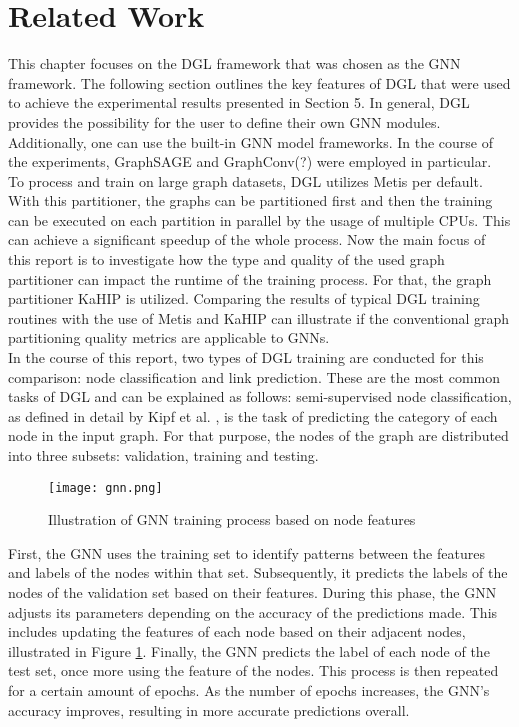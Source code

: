 \documentclass[acmsmall,nonacm,screen,review]{acmart}
\begin{document}
\section{Related Work}
This chapter focuses on the DGL framework that was chosen as the GNN framework. The following section outlines the key features of DGL that were used to achieve the experimental results presented in Section 5. In general, DGL provides the possibility for the user to define their own GNN modules. Additionally, one can use the built-in GNN model frameworks. In the course of the experiments, GraphSAGE \cite{GraphSAGE} and GraphConv(?) \cite{NC} were employed in particular. \\
To process and train on large graph datasets, DGL utilizes Metis per default. With this partitioner, the graphs can be partitioned first and then the training can be executed on each partition in parallel by the usage of multiple CPUs. This can achieve a significant speedup of the whole process. Now the main focus of this report is to investigate how the type and quality of the used graph partitioner can impact the runtime of the training process. For that, the graph partitioner KaHIP is utilized. Comparing the results of typical DGL training routines with the use of Metis and KaHIP can illustrate if the conventional graph partitioning quality metrics are applicable to GNNs. \\
In the course of this report, two types of DGL training are conducted for this comparison: node classification and link prediction. These are the most common tasks of DGL and can be explained as follows: semi-supervised node classification, as defined in detail by Kipf et al. \cite{NC}, is the task of predicting the category of each node in the input graph. For that purpose, the nodes of the graph are distributed into three subsets: validation, training and testing. \\  
\begin{figure}[bt!]
    \centering
    \texttt{[image: gnn.png]}
    \caption{Illustration of GNN training process based on node features}
    \label{learning}
\end{figure}
First, the GNN uses the training set to identify patterns between the features and labels of the nodes within that set. Subsequently, it predicts the labels of the nodes of the validation set based on their features. During this phase, the GNN adjusts its parameters depending on the accuracy of the predictions made. This includes updating the features of each node based on their adjacent nodes, illustrated in Figure \ref{learning}. Finally, the GNN predicts the label of each node of the test set, once more using the feature of the nodes. This process is then repeated for a certain amount of epochs. As the number of epochs increases, the GNN's accuracy improves, resulting in more accurate predictions overall. \\
\end{document}

